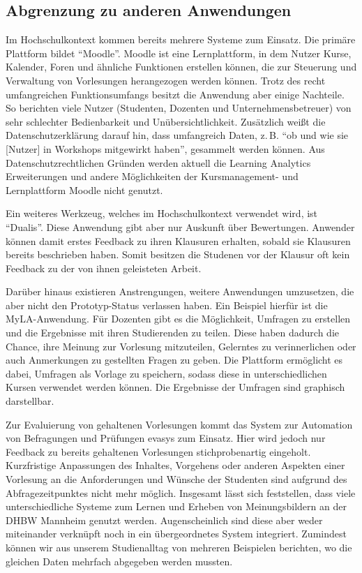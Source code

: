 \subsection{Abgrenzung zu anderen Anwendungen}
Im Hochschulkontext kommen bereits mehrere Systeme zum Einsatz.
Die primäre Plattform bildet \enquote{Moodle}.
Moodle ist eine Lernplattform, in dem Nutzer Kurse, Kalender, Foren und ähnliche Funktionen erstellen können, die zur Steuerung und Verwaltung von Vorlesungen herangezogen werden können.
Trotz des recht umfangreichen Funktionsumfangs besitzt die Anwendung aber einige Nachteile.
So berichten viele Nutzer (Studenten, Dozenten und Unternehmensbetreuer) von sehr schlechter Bedienbarkeit und Unübersichtlichkeit.
Zusätzlich weißt die Datenschutzerklärung darauf hin, dass umfangreich Daten, z.\,B. \enquote{ob und wie sie [Nutzer] in Workshops mitgewirkt haben}, gesammelt werden können.\autocites{moodleTermsOfServiceDHBW}{moodleTermsOfService}
Aus Datenschutzrechtlichen Gründen werden aktuell die Learning Analytics Erweiterungen und andere Möglichkeiten der Kursmanagement- und Lernplattform Moodle nicht genutzt.

Ein weiteres Werkzeug, welches im Hochschulkontext verwendet wird, ist \enquote{Dualis}.
Diese Anwendung gibt aber nur Auskunft über Bewertungen.
Anwender können damit erstes Feedback zu ihren Klausuren erhalten, sobald sie Klausuren bereits beschrieben haben.
Somit besitzen die Studenen vor der Klausur oft kein Feedback zu der von ihnen geleisteten Arbeit.

Darüber hinaus existieren Anstrengungen, weitere Anwendungen umzusetzen, die aber nicht den Prototyp-Status verlassen haben.
Ein Beispiel hierfür ist die MyLA-Anwendung.\autocite{mylaGithub}
Für Dozenten gibt es die Möglichkeit, Umfragen zu erstellen und die Ergebnisse mit ihren Studierenden zu teilen. Diese haben dadurch die Chance, ihre Meinung zur Vorlesung mitzuteilen, Gelerntes zu verinnerlichen oder auch Anmerkungen zu gestellten Fragen zu geben. Die Plattform ermöglicht es dabei, Umfragen als Vorlage zu speichern, sodass diese in unterschiedlichen Kursen verwendet werden können. Die Ergebnisse der Umfragen sind graphisch darstellbar.

Zur Evaluierung von gehaltenen Vorlesungen kommt das System zur Automation von Befragungen und Prüfungen evasys zum Einsatz. \autocite{evasys} Hier wird jedoch nur Feedback zu bereits gehaltenen Vorlesungen stichprobenartig eingeholt. Kurzfristige Anpassungen des Inhaltes, Vorgehens oder anderen Aspekten einer Vorlesung an die Anforderungen und Wünsche der Studenten sind aufgrund des Abfragezeitpunktes nicht mehr möglich. Insgesamt lässt sich feststellen, dass viele unterschiedliche Systeme zum Lernen und Erheben von Meinungsbildern an der DHBW Mannheim genutzt werden. Augenscheinlich sind diese aber weder miteinander verknüpft noch in ein übergeordnetes System integriert. Zumindest können wir aus unserem Studienalltag von mehreren Beispielen berichten, wo die gleichen Daten mehrfach abgegeben werden mussten.


